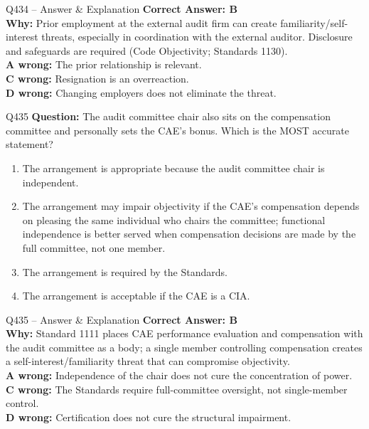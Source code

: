 \documentclass[aspectratio=169,10pt]{beamer}
\begin{document}
	\begin{frame}[t]{Q434 -- Answer \& Explanation}
		\small
		\textbf{Correct Answer: B} \\[4pt]
		\textbf{Why:} Prior employment at the external audit firm can create familiarity/self-interest threats, especially in coordination with the external auditor. Disclosure and safeguards are required (Code Objectivity; Standards 1130). \\[4pt]
		\textbf{A wrong:} The prior relationship is relevant. \\[2pt]
		\textbf{C wrong:} Resignation is an overreaction. \\[2pt]
		\textbf{D wrong:} Changing employers does not eliminate the threat.
	\end{frame}
	
	\begin{frame}[t]{Q435}
		\small
		\textbf{Question:} The audit committee chair also sits on the compensation committee and personally sets the CAE's bonus. Which is the MOST accurate statement?
		\begin{enumerate}[label=\Alph*.,itemsep=1pt,topsep=2pt]
			\item The arrangement is appropriate because the audit committee chair is independent.
			\item The arrangement may impair objectivity if the CAE's compensation depends on pleasing the same individual who chairs the committee; functional independence is better served when compensation decisions are made by the full committee, not one member.
			\item The arrangement is required by the Standards.
			\item The arrangement is acceptable if the CAE is a CIA.
		\end{enumerate}
	\end{frame}
	
	\begin{frame}[t]{Q435 -- Answer \& Explanation}
		\small
		\textbf{Correct Answer: B} \\[4pt]
		\textbf{Why:} Standard 1111 places CAE performance evaluation and compensation with the audit committee as a body; a single member controlling compensation creates a self-interest/familiarity threat that can compromise objectivity. \\[4pt]
		\textbf{A wrong:} Independence of the chair does not cure the concentration of power. \\[2pt]
		\textbf{C wrong:} The Standards require full-committee oversight, not single-member control. \\[2pt]
		\textbf{D wrong:} Certification does not cure the structural impairment.
	\end{frame}
	
\end{document}
